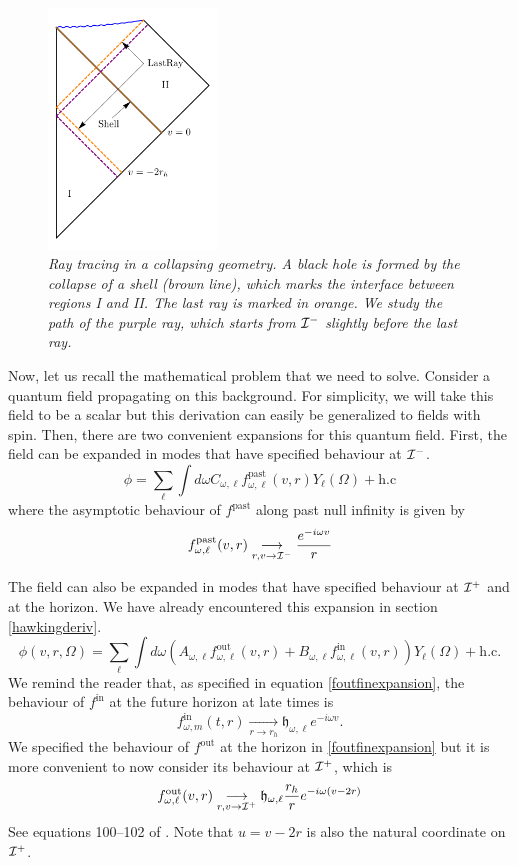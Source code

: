 \documentclass[12pt]{article}
\def\fpast{f^{\text{past}}}
\def\fout{f^{\text{out}}}
\def\fin{f^{\text{in}}}
\def\white{\mathfrak{h}}
\newcommand{\be}{\begin{equation}}
\newcommand{\ee}{\end{equation}}
\def \scrip{{\cal I}^{+}}
\def \scrim{{\cal I}^{-}}
\begin{document}
\begin{figure}[!ht]
\begin{center}
\includegraphics[width=0.4\textwidth]{raytracing_new.pdf}
\caption{\em Ray tracing in a collapsing geometry. A black hole is formed
by the collapse of a  shell (brown line), which marks the interface between
regions {\rm I} and {\rm II}. The last ray is marked in orange. We study the path of the purple ray, which starts from $\scrim$ slightly before the last ray.  \label{figraytracing}}
\end{center}
\end{figure} 


Now, let us recall the mathematical problem that we need to solve.  Consider a quantum field propagating on this background. For simplicity, we will take this field to be a scalar but this derivation can easily be generalized to fields with spin.   Then, there are two convenient expansions for this quantum field. First, the field can be expanded  in modes that have specified behaviour at $\scrim$. 
\be 
\phi = \sum_{\ell} \int d \omega  C_{\omega, \ell} \fpast_{\omega, \ell}(v, r) Y_{\ell}(\Omega) + \text{h.c}
\ee
where the asymptotic behaviour of $\fpast$ along past null infinity is given by
\be
\label{pastmodes}
\fpast_{\omega, \ell}(v,r) \underset{r,v \rightarrow {\cal I}^{-}}{\longrightarrow} {e^{-i \omega v} \over r}
\ee

The field can also be expanded in modes that have specified behaviour at $\scrip$ and at the horizon. We have already encountered this expansion  in section \ref{hawkingderiv}.
\be
\label{futuremodes}
\phi(v, r, \Omega) = \sum_{\ell} \int {d \omega}  \left(A_{\omega, \ell} \fout_{\omega, \ell}(v,r) + B_{\omega,\ell} \fin_{\omega,\ell}(v, r) \right) Y_{\ell}(\Omega) + \text{h.c}.
\ee
We remind the reader that, as specified in equation \eqref{foutfinexpansion}, the behaviour of $\fin$ at the future horizon at late times is
\be
\fin_{\omega, m}(t,r) \underset{r \rightarrow r_h}{\longrightarrow} \white_{\omega, \ell} e^{-i \omega v}.
\ee
 We specified the behaviour of $\fout$ at the horizon in \eqref{foutfinexpansion} but it is more convenient to now consider its behaviour at $\scrip$, which is
\be
\fout_{\omega, \ell}(v,r) \underset{r,v \rightarrow {\cal I}^{+}}{\longrightarrow} \white_{\omega, \ell} {r_h \over r} {e^{-i \omega (v - 2 r)}}
\ee
See equations 100--102 of \cite{dewitt1975quantum}. Note that $u = v - 2 r$ is also the natural coordinate on $\scrip$.
\end{document}
